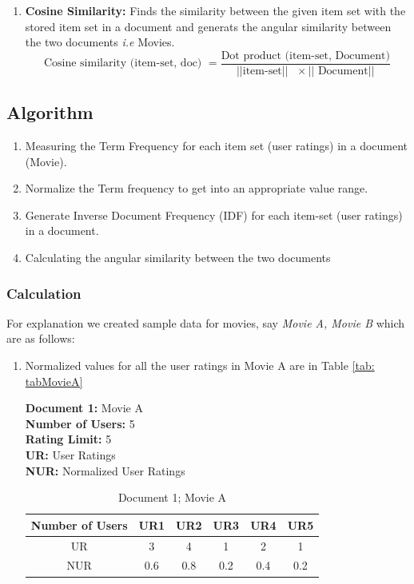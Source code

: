 \documentclass[12pt, titlepage, onecolumn]{article}
\begin{document}
{\begin{enumerate}
	\item{\bf Cosine Similarity: } Finds the similarity between the given item set with the stored item set in a document and generats the angular similarity between the two documents \emph{i.e} Movies.
	\label{itm: cosineFormula}
		\begin{equation}
		\label{eq: idf}
			\text{Cosine similarity (item-set, doc) } = \frac{\text{Dot product (item-set, Document)}}{||\text{item-set}||\text{ }\times ||\text{ Document}||}
		\end{equation}
\end{enumerate}

\subsection{Algorithm}
\begin{enumerate}[ {STEP }1{:}]
	\item Measuring the Term Frequency for each item set (user ratings) in a document (Movie). 
	\item Normalize the Term frequency to get into an appropriate value range.
	\item Generate Inverse Document Frequency (IDF) for each item-set (user ratings) in a document.
	\item Calculating the angular similarity between the two documents 
\end{enumerate}

\subsubsection{Calculation}
For explanation we created sample data for movies, say \emph{Movie A, Movie B} which are as follows:

\begin{enumerate}
	\item Normalized values for all the user ratings in Movie A are in Table \ref{tab: tabMovieA}
	
		{\bf Document 1: } Movie A\\
		{\bf Number of Users: }5\\
		{\bf Rating Limit: }5\\
		{\bf UR: }User Ratings\\
		{\bf NUR: }Normalized User Ratings		
		\begin{table}[ht]
		\label{tab: tabMovieA}
		
		\begin{center}
		\begin{tabular}{cccccc}
    		\hline
       			Number of Users	&	UR1	&	UR2	&	UR3	&	UR4	&	UR5\\
		\hline
    			UR				&	3	&	4	&	1	&	2	&	1\\
			NUR				&	0.6	&	0.8	&	0.2	&	0.4	&	0.2\\
    		\hline
		\end{tabular}
		\caption{Document 1; Movie A}
		\end{center}
		\label{tab:movieA}
		\end{table}
		

\end{enumerate}}
\end{document}

